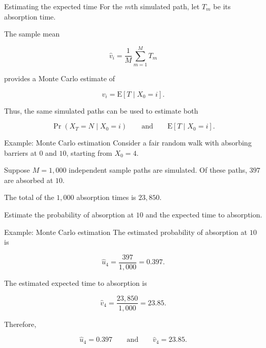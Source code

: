 \documentclass[
  ignorenonframetext,
  aspectratio=169,
]{beamer}
\begin{document}
\begin{frame}{Estimating the expected time}
\protect{}\label{estimating-the-expected-time}
For the \(m\)th simulated path, let \(T_m\) be its absorption time.

The sample mean

\[
\widehat{v}_i=\frac{1}{M}\sum_{m=1}^{M}T_m
\]

provides a Monte Carlo estimate of

\[
v_i=\mathrm{E}[T\mid X_0=i].
\]

Thus, the same simulated paths can be used to estimate both

\[
\Pr(X_T=N\mid X_0=i)
\qquad\text{and}\qquad
\mathrm{E}[T\mid X_0=i].
\]
\end{frame}

\begin{frame}{Example: Monte Carlo estimation}
\protect{}\label{example-monte-carlo-estimation}
Consider a fair random walk with absorbing barriers at \(0\) and \(10\),
starting from \(X_0=4\).

Suppose \(M=1{,}000\) independent sample paths are simulated. Of these
paths, \(397\) are absorbed at \(10\).

The total of the \(1{,}000\) absorption times is \(23{,}850\).

Estimate the probability of absorption at \(10\) and the expected time
to absorption.
\end{frame}

\begin{frame}{Example: Monte Carlo estimation}
\protect{}\label{example-monte-carlo-estimation-1}
The estimated probability of absorption at \(10\) is

\[
\widehat{u}_4=\frac{397}{1{,}000}=0.397.
\]

The estimated expected time to absorption is

\[
\widehat{v}_4=\frac{23{,}850}{1{,}000}=23.85.
\]

Therefore,

\[
\boxed{\widehat{u}_4=0.397}
\qquad\text{and}\qquad
\boxed{\widehat{v}_4=23.85}.
\]
\end{frame}
\end{document}
